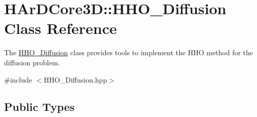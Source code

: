 \hypertarget{classHArDCore3D_1_1HHO__Diffusion}{}\section{H\+Ar\+D\+Core3D\+:\+:H\+H\+O\+\_\+\+Diffusion Class Reference}
\label{classHArDCore3D_1_1HHO__Diffusion}


The \hyperlink{classHArDCore3D_1_1HHO__Diffusion}{H\+H\+O\+\_\+\+Diffusion} class provides tools to implement the H\+HO method for the diffusion problem.  




{\ttfamily \#include $<$H\+H\+O\+\_\+\+Diffusion.\+hpp$>$}

\subsection*{Public Types}
